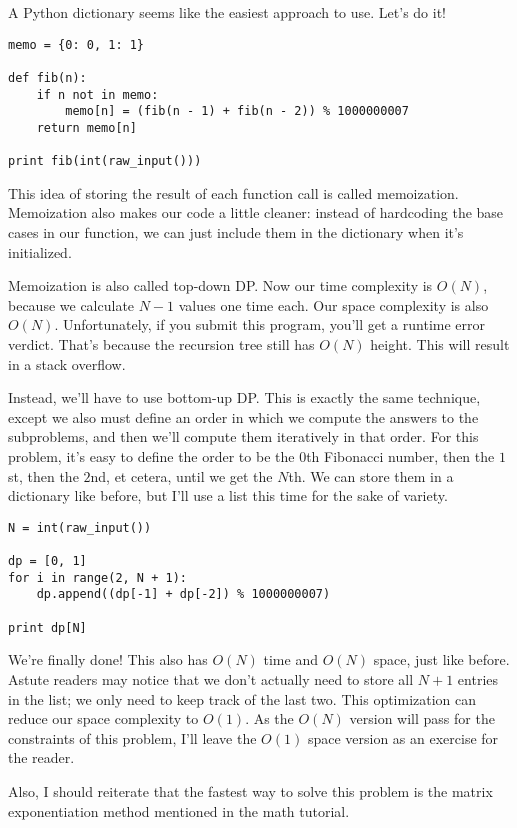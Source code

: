A Python dictionary seems like the easiest approach to use. Let's do it!

\begin{verbatim}
memo = {0: 0, 1: 1}

def fib(n):
    if n not in memo:
        memo[n] = (fib(n - 1) + fib(n - 2)) % 1000000007
    return memo[n]

print fib(int(raw_input()))
\end{verbatim}

This idea of storing the result of each function call is called memoization. Memoization also makes our code a little cleaner: instead of hardcoding the base cases in our function, we can just include them in the dictionary when it's initialized.

Memoization is also called top-down DP. Now our time complexity is $O(N)$, because we calculate $N - 1$ values one time each. Our space complexity is also $O(N)$. Unfortunately, if you submit this program, you'll get a runtime error verdict. That's because the recursion tree still has $O(N)$ height. This will result in a stack overflow.

Instead, we'll have to use bottom-up DP. This is exactly the same technique, except we also must define an order in which we compute the answers to the subproblems, and then we'll compute them iteratively in that order. For this problem, it's easy to define the order to be the $0$th Fibonacci number, then the $1$st, then the $2$nd, et cetera, until we get the $N$th. We can store them in a dictionary like before, but I'll use a list this time for the sake of variety.

\begin{verbatim}
N = int(raw_input())

dp = [0, 1]
for i in range(2, N + 1):
    dp.append((dp[-1] + dp[-2]) % 1000000007)

print dp[N]
\end{verbatim}

We're finally done! This also has $O(N)$ time and $O(N)$ space, just like before. Astute readers may notice that we don't actually need to store all $N + 1$ entries in the list; we only need to keep track of the last two. This optimization can reduce our space complexity to $O(1)$. As the $O(N)$ version will pass for the constraints of this problem, I'll leave the $O(1)$ space version as an exercise for the reader.

Also, I should reiterate that the fastest way to solve this problem is the matrix exponentiation method mentioned in the math tutorial.

